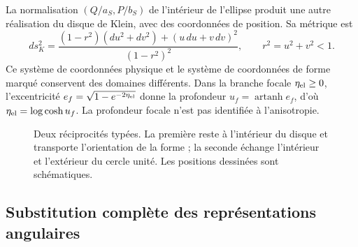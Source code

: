La normalisation \((Q/a_S,P/b_S)\) de l’intérieur de l’ellipse produit une autre réalisation du disque de Klein, avec des coordonnées de position. Sa métrique est
\[
 ds_K^2=\frac{(1-r^2)(du^2+dv^2)+(u\,du+v\,dv)^2}{(1-r^2)^2},
 \qquad r^2=u^2+v^2<1.
\]
Ce système de coordonnées physique et le système de coordonnées de forme marqué conservent des domaines différents. Dans la branche focale \(\eta_{\rm el}\ge0\), l’excentricité \(e_f=\sqrt{1-e^{-2\eta_{\rm el}}}\) donne la profondeur \(u_f=\operatorname{artanh}e_f\), d’où \(\eta_{\rm el}=\log\cosh u_f\). La profondeur focale n’est pas identifiée à l’anisotropie.

\begin{figure}[htbp]
\centering
{}
\caption{Deux réciprocités typées. La première reste à l’intérieur du disque et transporte l’orientation de la forme ; la seconde échange l’intérieur et l’extérieur du cercle unité. Les positions dessinées sont schématiques.
}
\label{fig:rec-dos-cartas}
\end{figure}

\subsection{Substitution complète des représentations angulaires}
\label{rec:sustitucion}

